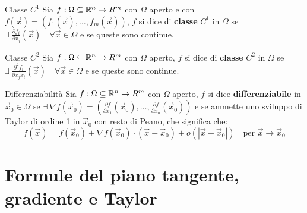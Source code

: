 	\begin{definizione}{Classe $C^1$}
	Sia $f:\Omega \subseteq \mathbb{R}^n \rightarrow R^m$ con $\Omega$ aperto e con $f(\vec x)=\left(f_1(\vec x),\dots,f_m(\vec x)\right)$, $f$ si dice di \textbf{classe} $C^1$ in $\Omega$ se $\exists \ \frac{\partial f_i}{\partial x_j}(\vec x) \quad \forall \vec x \in \Omega$ e se queste sono continue.
  \end{definizione}
	\begin{definizione}{Classe $C^2$}
	Sia $f:\Omega \subseteq \mathbb{R}^n \rightarrow R^m$ con $\Omega$ aperto, $f$ si dice di \textbf{classe} $C^2$ in $\Omega$ se $\exists \ \frac{\partial^2 f_i}{\partial x_j x_i}(\vec x) \quad \forall \vec x \in \Omega$ e se queste sono continue.
  \end{definizione}
	\begin{definizione}{Differenziabilità}
	Sia $f:\Omega \subseteq \mathbb{R}^n \rightarrow R^m$ con $\Omega$ aperto, $f$ si dice \textbf{differenziabile} in $\vec x_0  \in \Omega$ se $\exists \ \nabla f(\vec x_0)=\left(\frac{\partial f}{\partial x_1}(\vec x_0), \dots , \frac{\partial f}{\partial x_n}(\vec x_0)\right)$ e se ammette uno sviluppo di Taylor di ordine 1 in $\vec x_0$ con resto di Peano, che significa che:
	$$f(\vec x)=f(\vec x_0)+\nabla f(\vec x_0)\cdot (\vec x - \vec x_0)+ o(|\vec x-\vec x_0|) \quad \text{per }\vec x \rightarrow \vec x_0$$
  \end{definizione}


	\section{Formule del piano tangente, gradiente e Taylor}


